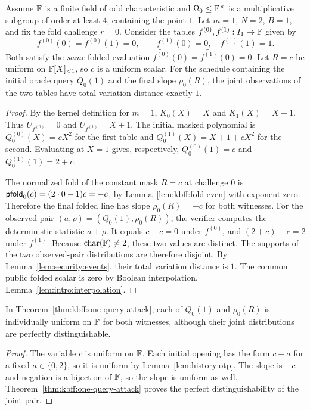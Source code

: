 \begin{theorem}\label{thm:kbff:one-query-attack}
Assume $\mathbb{F}$ is a finite field of odd characteristic and
$\Omega_0\leq\mathbb{F}^\times$ is a multiplicative subgroup of order at least $4$,
containing the point $1$.
Let $m=1$, $N=2$, $B=1$, and fix the fold challenge $r=0$.
Consider the tables $f^{(0)},f^{(1)}:I_1\to\mathbb{F}$ given by
\[
 f^{(0)}(0)=f^{(0)}(1)=0,\qquad
 f^{(1)}(0)=0,\quad f^{(1)}(1)=1.
\]
Both satisfy the \emph{same} folded evaluation
$\widetilde{f^{(0)}}(0)=\widetilde{f^{(1)}}(0)=0$.
Let $R=c$ be uniform on $\mathbb{F}[X]_{<1}$, so $c$ is a uniform scalar.
For the schedule containing the initial oracle query $Q_0(1)$
and the final slope $\rho_0(R)$, the joint observations of the two
tables have total variation distance exactly $1$.
\end{theorem}
\begin{proof}
By the kernel definition for $m=1$, $K_0(X)=X$ and
$K_1(X)=X+1$. Thus
$U_{f^{(0)}}=0$ and $U_{f^{(1)}}=X+1$.
The initial masked polynomial is
$Q_0^{(0)}(X)=cX^2$ for the first table and
$Q_0^{(1)}(X)=X+1+cX^2$ for the second.
Evaluating at $X=1$ gives, respectively,
$Q_0^{(0)}(1)=c$ and $Q_0^{(1)}(1)=2+c$.

The normalized fold of the constant mask $R=c$ at challenge $0$ is
$\mathsf{pfold}_0(c)=(2\cdot0-1)c=-c$, by
Lemma~\ref{lem:kbff:fold-even} with exponent zero.
Therefore the final folded line has slope
$\rho_0(R)=-c$ for both witnesses.
For the observed pair $(a,\rho)=(Q_0(1),\rho_0(R))$,
the verifier computes the deterministic statistic $a+\rho$.
It equals $c-c=0$ under $f^{(0)}$, and
$(2+c)-c=2$ under $f^{(1)}$.
Because $\operatorname{char}(\mathbb{F})\neq2$, these two values are distinct.
The supports of the two observed-pair distributions are therefore
disjoint. By Lemma~\ref{lem:security:events}, their total variation
distance is $1$. The common public folded scalar is zero by
Boolean interpolation, Lemma~\ref{lem:intro:interpolation}.
\end{proof}

\begin{corollary}\label{cor:kbff:uniform-marginals}
In Theorem~\ref{thm:kbff:one-query-attack}, each of
$Q_0(1)$ and $\rho_0(R)$ is individually uniform on $\mathbb{F}$ for
both witnesses, although their joint distributions are perfectly
distinguishable.
\end{corollary}
\begin{proof}
The variable $c$ is uniform on $\mathbb{F}$. Each initial opening has
the form $c+a$ for a fixed $a\in\{0,2\}$, so it is uniform by
Lemma~\ref{lem:history:otp}. The slope is $-c$ and negation
is a bijection of $\mathbb{F}$, so the slope is uniform as well.
Theorem~\ref{thm:kbff:one-query-attack} proves the perfect
distinguishability of the joint pair.
\end{proof}

